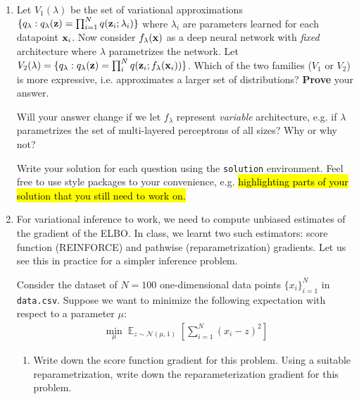 \documentclass[11pt]{article}
\newenvironment{solution}{\proof[Solution]\color{blue}}{\endproof}
\begin{document}
\begin{enumerate}[label=(\Alph*)]

    \item Let $V_1(\lambda)$ be the set of variational approximations $\{q_\lambda: q_{\lambda}(\mathbf{z}) = \prod_{i=1}^N 
    q({\mathbf z}_i; \lambda_i)\}$ where $\lambda_i$ are parameters learned for each datapoint ${\mathbf x}_i$. Now consider $f_\lambda({\mathbf x})$ as a deep neural network with \textit{fixed} architecture where $\lambda$ parametrizes the network. Let $V_2(\lambda)= \{q_\lambda : q_\lambda({\mathbf z}) = \prod_i^N q({\mathbf z}_i; f_\lambda({\mathbf x}_i))\}$. 
    Which of the two families ($V_1$ or $V_2$) is more expressive, i.e. approximates a larger set of distributions? \textbf{Prove} your answer. 
    
    Will your answer change if we let $f_\lambda$ represent \textit{variable} architecture, e.g. if $\lambda$ parametrizes the set of multi-layered perceptrons of all sizes? Why or why not?   

        \begin{solution}
           Write your solution for each question using the \texttt{solution} environment. Feel free to use style packages to your convenience, e.g. \hl{highlighting parts of your solution that you still need to work on.}
        \end{solution}
        
    \item For variational inference to work, we need to compute unbiased estimates of the gradient of the ELBO. In class, we learnt two such estimators: score function (REINFORCE) and pathwise (reparametrization) gradients. Let us see this in practice for a simpler inference problem.
        
    Consider the dataset of $N=100$ one-dimensional data points $\{x_i\}^N_{i=1}$ in \texttt{data.csv}. Suppose we want to minimize the following expectation with respect to a parameter $\mu$:
        \begin{align}\label{eqn:sfg}
            \min_\mu \mathop{\mathbb{E}}_{z\sim \mathcal{N}(\mu,1)} \left[ \sum^N_{i=1} (x_i - z)^2 \right]  
        \end{align}
            
    \begin{enumerate}[label=(\roman*)]
        
        \item Write down the score function gradient for this problem. Using a suitable reparametrization, write down the reparameterization gradient for this problem. 
        

\end{enumerate}
\end{enumerate}
\end{document}

